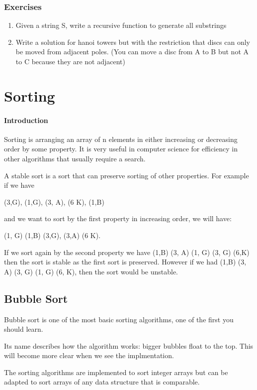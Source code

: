 \documentclass[11pt,oneside]{book}
\begin{document}
\subsection{Exercises}

\begin{enumerate}
\item Given a string S, write a recursive function to generate all substrings
\item Write a solution for hanoi towers but with the restriction that discs can only be moved from adjacent poles. (You can move a disc from A to B but not A to C because they are not adjacent)
\end{enumerate}
\chapter{Sorting}\subsubsection{Introduction}

Sorting is arranging an array of n elements in either increasing or decreasing order by some property. It is very useful in computer science for efficiency in other algorithms that usually require a search.

A stable sort is a sort that can preserve sorting of other properties. For example if we have

(3,G), (1,G), (3, A), (6 K), (1,B)

and we want to sort by the first property in increasing order, we will have:

(1, G) (1,B) (3,G), (3,A) (6 K).

If we sort again by the second property we have (1,B) (3, A) (1, G) (3, G) (6,K) then the sort is stable as the first sort is preserved. However if we had (1,B) (3, A) (3, G) (1, G) (6, K), then the sort would be unstable.

\section{Bubble Sort}

Bubble sort is one of the most basic sorting algorithms, one of the first you should learn.

Its name describes how the algorithm works: bigger bubbles float to the top. This will become more clear when we see the implmentation.

The sorting algorithms are implemented to sort integer arrays but can be adapted to sort arrays of any data structure that is comparable.
\end{document}
